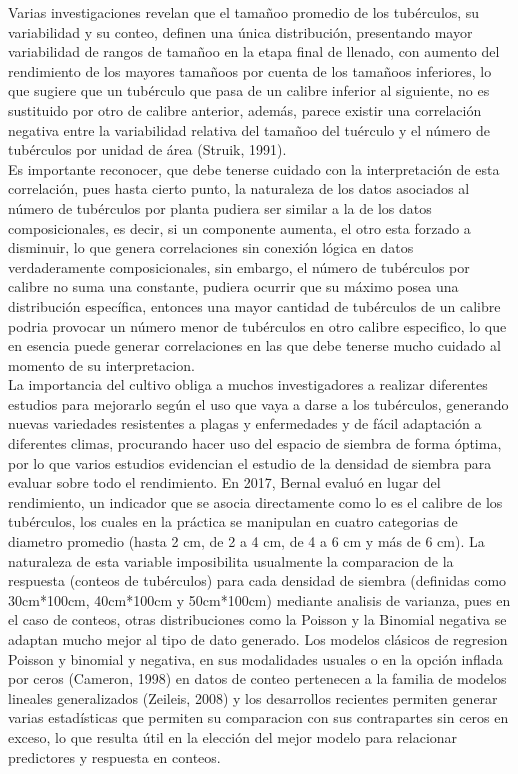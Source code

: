 Varias investigaciones revelan que el tamañoo promedio de los tubérculos, su variabilidad y su conteo, definen una única distribución, presentando mayor variabilidad de rangos de tamañoo en la etapa final de llenado, con aumento del rendimiento de los mayores tamañoos por cuenta de los tamañoos inferiores, lo que sugiere que un tubérculo que pasa de un calibre inferior al siguiente, no es sustituido por otro de calibre anterior, además, parece existir una correlación negativa entre la variabilidad relativa del tamañoo del tuérculo y el número de tubérculos por unidad de área (Struik, 1991).\\

Es importante reconocer, que debe tenerse cuidado con la interpretación de esta correlación, pues hasta cierto punto, la naturaleza de los datos asociados al número de tubérculos por planta pudiera ser similar a la de los datos composicionales, es decir, si un componente aumenta, el otro esta forzado a disminuir, lo que genera correlaciones sin conexión lógica en datos verdaderamente composicionales, sin embargo, el número de tubérculos por calibre no suma una constante, pudiera ocurrir que su máximo posea una distribución específica, entonces una mayor cantidad de tubérculos de un calibre podria provocar un número menor de tubérculos en otro calibre especifico, lo que en esencia puede generar correlaciones en las que debe tenerse mucho cuidado al momento de su interpretacion.\\

 La importancia del cultivo obliga a muchos investigadores a realizar diferentes estudios para mejorarlo según el uso que vaya a darse a los tubérculos, generando nuevas variedades resistentes a plagas y enfermedades y de fácil adaptación a diferentes climas, procurando hacer uso del espacio de siembra de forma óptima, por lo que varios estudios evidencian el estudio de la densidad de siembra para evaluar sobre todo el rendimiento. En 2017, Bernal evaluó en lugar del rendimiento, un indicador que se asocia directamente como lo es el calibre de los tubérculos, los cuales en la práctica se manipulan en cuatro categorias de diametro promedio (hasta 2 cm, de 2 a 4 cm, de 4 a 6 cm y más de 6 cm). La naturaleza de esta variable imposibilita usualmente la comparacion de la respuesta (conteos de tubérculos) para cada densidad de siembra (definidas como 30cm*100cm, 40cm*100cm y 50cm*100cm) mediante analisis de varianza, pues en el caso de conteos, otras distribuciones como la Poisson y la Binomial negativa se adaptan mucho mejor al tipo de dato generado. Los modelos clásicos de regresion Poisson y binomial y negativa, en sus modalidades usuales o en la opción inflada por ceros (Cameron, 1998) en datos de conteo pertenecen a la familia de modelos lineales generalizados (Zeileis, 2008) y los desarrollos recientes permiten generar varias estadísticas que permiten su comparacion con sus contrapartes sin ceros en exceso, lo que resulta útil en la elección del mejor modelo para relacionar predictores y respuesta en conteos.\\

